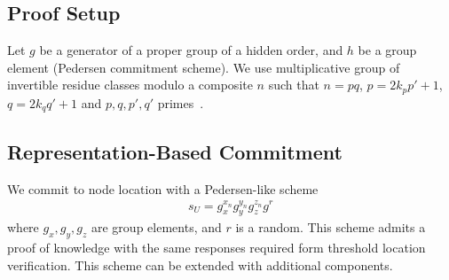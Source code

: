 \documentclass{article}
\begin{document}
\subsection{Proof Setup}

Let $g$ be a generator of a proper group of a hidden order,
and $h$ be a group element (Pedersen commitment scheme).
We use multiplicative group of invertible residue classes modulo a composite $n$ such that
$n=pq$, $p=2 k_p p'+1$, $q=2 k_q q'+1$ and $p, q, p', q'$ primes~\cite{Idemix}.

\subsection{Representation-Based Commitment}
We commit to node location with a Pedersen-like scheme~\cite{PedersenCommit,BrandsPKIbook}
\begin{gather}
\label{cmt-up-cp}
  s_U = g_x^{x_n} g_y^{y_n} g_z^{z_n} g^{r}
\end{gather}
where $g_x, g_y, g_z$ are group elements, and $r$ is a random.
This scheme admits a proof of knowledge with the same responses required form threshold location verification.
This scheme can be extended with additional components. %
\end{document}
